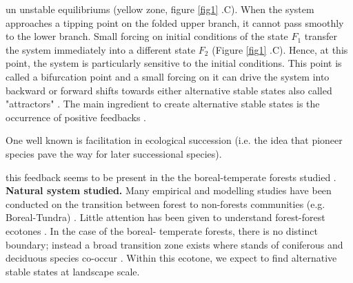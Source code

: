 un unstable equilibriums (yellow zone, figure \ref{fig1} .C). When the system
approaches a tipping point on the folded upper branch, it cannot pass smoothly
to the lower branch. Small forcing on initial conditions of the state $F_1$
transfer the system immediately into a different state $F_2$ (Figure
\ref{fig1} .C). Hence, at this point, the system is particularly sensitive to
the initial conditions. This point is called a bifurcation point and a small
forcing on it can drive the system into backward or forward shifts towards
either alternative stable states also called "attractors"
\cite{scheffer2009critical}. The main ingredient to create alternative
stable states is the occurrence of positive feedbacks
\cite{scheffer2009critical,Schroder2005}.

One well known is
facilitation in ecological succession (i.e. the idea that pioneer species pave
the way for later successional species). 


 this feedback seems to be present in the the
boreal-temperate forests studied \cite{Barras1998,Society2014}. \\


\textbf{Natural system studied.} Many empirical and modelling studies have
been conducted on the transition between forest to non-forests communities
(e.g. Boreal-Tundra) \cite{Scheffer2012,Scheffer2001,Hirota2011,Messaoud2007}.
Little attention has been given to understand forest-forest ecotones
\cite{Goldblum2010,Graignic2013,Messaoud2007}.  In the case of the boreal-
temperate  forests, there is no distinct boundary; instead a broad transition
zone exists where stands of coniferous and deciduous species co-occur
\cite{Goldblum2010,Fisichelli2013}. Within this ecotone, we expect to find
alternative stable states at landscape scale. 

